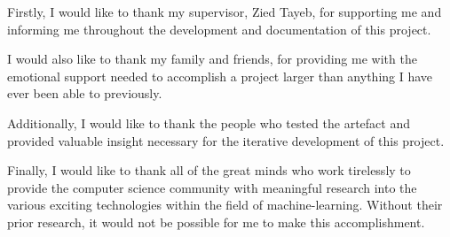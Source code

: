 \begin{acknowledgements}
Firstly, I would like to thank my supervisor, Zied Tayeb, for supporting me and informing me throughout the development and documentation of this project.

I would also like to thank my family and friends, for providing me with the emotional support needed to accomplish a project larger than anything I have ever been able to previously.

Additionally, I would like to thank the people who tested the artefact and provided valuable insight necessary for the iterative development of this project.

Finally, I would like to thank all of the great minds who work tirelessly to provide the computer science community with meaningful research into the various exciting technologies within the field of machine-learning. Without their prior research, it would not be possible for me to make this accomplishment.
\end{acknowledgements}